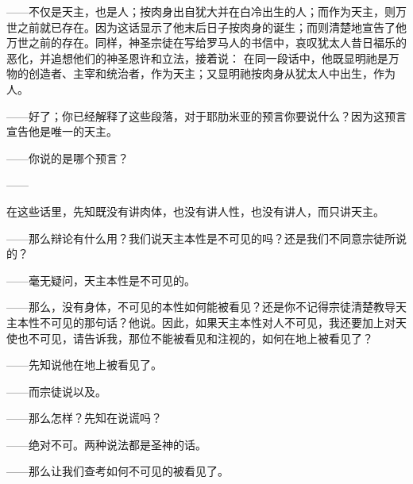 ——不仅是天主，也是人；按肉身出自犹大并在白冷出生的人；而作为天主，则万世之前就已存在。因为这话显示了他末后日子按肉身的诞生；而则清楚地宣告了他万世之前的存在。同样，神圣宗徒在写给罗马人的书信中，哀叹犹太人昔日福乐的恶化，并追想他们的神圣恩许和立法，接着说： 在同一段话中，他既显明祂是万物的创造者、主宰和统治者，作为天主；又显明祂按肉身从犹太人中出生，作为人。\par

——好了；你已经解释了这些段落，对于耶肋米亚的预言你要说什么？因为这预言宣告他是唯一的天主。\par

——你说的是哪个预言？\par

——\par

在这些话里，先知既没有讲肉体，也没有讲人性，也没有讲人，而只讲天主。\par

——那么辩论有什么用？我们说天主本性是不可见的吗？还是我们不同意宗徒所说的？\par

——毫无疑问，天主本性是不可见的。\par

——那么，没有身体，不可见的本性如何能被看见？还是你不记得宗徒清楚教导天主本性不可见的那句话？他说。因此，如果天主本性对人不可见，我还要加上对天使也不可见，请告诉我，那位不能被看见和注视的，如何在地上被看见了？\par

——先知说他在地上被看见了。\par

——而宗徒说以及。\par

——那么怎样？先知在说谎吗？\par

——绝对不可。两种说法都是圣神的话。\par

——那么让我们查考如何不可见的被看见了。\par

